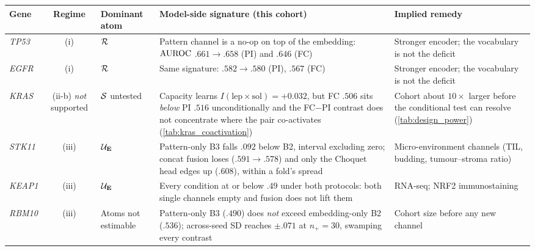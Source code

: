\footnotesize
\setlength{\tabcolsep}{4pt}
\renewcommand{\arraystretch}{1.15}
\begin{tabularx}{\linewidth}{l c l X X}
\toprule
\textbf{Gene} & \textbf{Regime} & \textbf{Dominant atom} &
  \textbf{Model-side signature (this cohort)} &
  \textbf{Implied remedy} \\
\midrule
\textit{TP53}  & (i)   & $\mathcal{R}$
  & Pattern channel is a no-op on top of the embedding:
    $\text{AUROC}$ $.661\!\to\!.658$ (PI) and $.646$ (FC)
  & Stronger encoder; the vocabulary is not the deficit \\
\textit{EGFR}  & (i)   & $\mathcal{R}$
  & Same signature: $.582\!\to\!.580$ (PI), $.567$ (FC)
  & Stronger encoder; the vocabulary is not the deficit \\
\midrule
\textit{KRAS}  & (ii-b) \emph{not} supported & $\mathcal{S}$ untested
  & Capacity learns $I(\text{lep}\!\times\!\text{sol})={+}0.032$, but
    FC $.506$ sits \emph{below} PI $.516$ unconditionally and the
    FC${-}$PI contrast does not concentrate where the pair
    co-activates (\cref{tab:kras_coactivation})
  & Cohort about $10\times$ larger before the conditional test can
    resolve (\cref{tab:design_power}) \\
\midrule
\textit{STK11} & (iii) & $\mathcal{U}_{\mathbf{E}}$
  & Pattern-only B3 falls $.092$ below B2, interval excluding zero;
    concat fusion loses ($.591\!\to\!.578$) and only the Choquet head
    edges up ($.608$), within a fold's spread
  & Micro-environment channels (TIL, budding, tumour--stroma ratio) \\
\textit{KEAP1} & (iii) & $\mathcal{U}_{\mathbf{E}}$
  & Every condition at or below $.49$ under both protocols: both
    single channels empty and fusion does not lift them
  & RNA-seq; NRF2 immunostaining \\
\textit{RBM10} & (iii) & Atoms not estimable
  & Pattern-only B3 ($.490$) does \emph{not} exceed embedding-only B2
    ($.536$); across-seed SD reaches $\pm.071$ at $n_+\!=\!30$,
    swamping every contrast
  & Cohort size before any new channel \\
\bottomrule
\end{tabularx}
